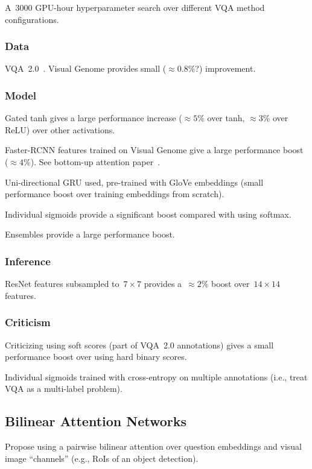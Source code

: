 \documentclass[a4paper, 12pt]{article}
\begin{document}
A~\num{3000} GPU-hour hyperparameter search over different VQA method
configurations.


\subsubsection{Data}

VQA~2.0~\citet{goyal2017making}. Visual Genome provides small
($\approx 0.8\%$?) improvement.


\subsubsection{Model}

Gated tanh gives a large performance increase ($\approx 5\%$ over tanh,
$\approx 3\%$ over ReLU) over other activations.

Faster-RCNN features trained on Visual Genome give a large performance boost
($\approx 4\%$).  See bottom-up attention paper~\citet{anderson2017bottom}.

Uni-directional GRU used, pre-trained with GloVe embeddings (small performance
boost over training embeddings from scratch).

Individual sigmoids provide a significant boost compared with using softmax.

Ensembles provide a large performance boost.


\subsubsection{Inference}

ResNet features subsampled to~$7 \times 7$ provides a~$\approx 2\%$ boost
over~$14 \times 14$ features.


\subsubsection{Criticism}

Criticizing using soft scores (part of VQA~2.0 annotations) gives a small
performance boost over using hard binary scores.

Individual sigmoids trained with cross-entropy on multiple annotations (i.e.,
treat VQA as a multi-label problem).


\subsection{Bilinear Attention Networks}

Propose using a pairwise bilinear attention over question embeddings and visual
image ``channels'' (e.g., RoIs of an object detection).
\end{document}
